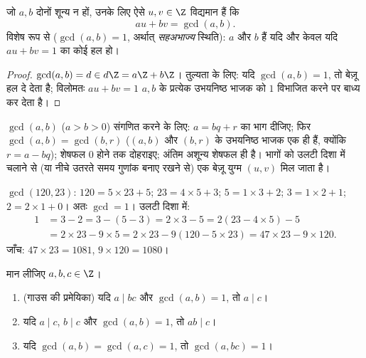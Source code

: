 \begin{corollary}[बेज़ू सर्वसमिका]\label{cor:b1:arith:bezout}
जो $a, b$ दोनों शून्य न हों, उनके लिए ऐसे $u, v \in \Z$ विद्यमान हैं कि
\[
au + bv = \gcd(a, b) .
\]
विशेष रूप से ($\gcd(a,b) = 1$, अर्थात् \emph{सहअभाज्य}
स्थिति): $a$ और $b$  हैं यदि और केवल यदि $au + bv = 1$ का कोई हल हो।
\end{corollary}

\begin{proof}
$\gcd(a,b) = d \in d\Z = a\Z + b\Z$। तुल्यता के लिए: यदि $\gcd(a,b) = 1$, तो
बेज़ू हल दे देता है; विलोमतः $au + bv = 1$ $a, b$ के प्रत्येक उभयनिष्ठ भाजक
को $1$ विभाजित करने पर बाध्य कर देता है।
\end{proof}

\begin{method}[यूक्लिडीय कलनविधि, विस्तारित]\label{met:b1:arith:euclid}
$\gcd(a, b)$ ($a > b > 0$) संगणित करने के लिए: $a = bq + r$ का भाग दीजिए;
फिर $\gcd(a, b) = \gcd(b, r)$ ($(a,b)$ और $(b,r)$ के उभयनिष्ठ भाजक एक ही
हैं, क्योंकि $r = a - bq$); शेषफल $0$ होने तक दोहराइए; अंतिम अशून्य शेषफल ही
 है। भागों को उलटी दिशा में चलाने
से (या नीचे उतरते समय गुणांक बनाए रखने से) एक बेज़ू युग्म $(u, v)$ मिल जाता
है।
\end{method}

\begin{example}\label{ex:b1:arith:euclid}
$\gcd(120, 23)$: $120 = 5 \times 23 + 5$; $23 = 4 \times 5 + 3$; $5 =
1\times 3 + 2$; $3 = 1 \times 2 + 1$; $2 = 2 \times 1 + 0$। अतः $\gcd = 1$।
उलटी दिशा में:
\begin{align*}
1 &= 3 - 2 = 3 - (5 - 3) = 2\times 3 - 5 = 2(23 - 4\times 5) - 5 \\
&= 2 \times 23 - 9 \times 5 = 2\times 23 - 9(120 - 5\times 23)
= 47 \times 23 - 9 \times 120 .
\end{align*}
जाँच: $47 \times 23 = 1081$, $9 \times 120 = 1080$।
\end{example}

\begin{theorem}[गाउस की प्रमेयिका और उसके परिणाम]\label{thm:b1:arith:gauss}
मान लीजिए $a, b, c \in \Z$।
\begin{enumerate}
  \item (गाउस की प्रमेयिका) यदि $a \mid bc$ और
  $\gcd(a, b) = 1$, तो $a \mid c$।
  \item यदि $a \mid c$, $b \mid c$ और $\gcd(a,b) = 1$, तो $ab \mid c$।
  \item यदि $\gcd(a, b) = \gcd(a, c) = 1$, तो $\gcd(a, bc) = 1$।
\end{enumerate}
\end{theorem}

